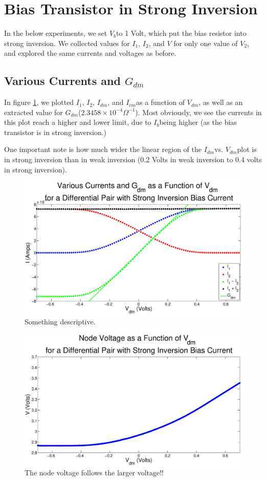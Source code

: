\documentclass{article}
\newcommand{\Vb}{{$V_{b}$}}
\newcommand{\Vtwo}{{$V_{2}$}}
\newcommand{\Itwo}{{$I_{2}$}}
\newcommand{\Ione}{{$I_{1}$}}
\newcommand{\gdm}{{$G_{dm}$}}
\newcommand{\Vdm}{{$V_{dm}$}}
\newcommand{\Idm}{{$I_{dm}$}}
\newcommand{\Icm}{{$I_{cm}$}}
\newcommand{\Ib}{{$I_{b}$}}
\begin{document}
\section*{Bias Transistor in Strong Inversion}

In the below experiments, we set \Vb to 1 Volt, which put the bias resistor into strong inversion. We collected values for \Ione, \Itwo, and $V$ for only one value of \Vtwo, and explored the same currents and voltages as before.

\subsection*{Various Currents and \gdm}

In figure \ref{fig:AllCurrentsStrongInversion}, we plotted \Ione, \Itwo, \Idm, and \Icm as a function of \Vdm, as well as an extracted value for \gdm ($2.3458 \times 10^{-4} \Omega^{-1}$). Most obviously, we see the currents in this plot reach a higher and lower limit, due to \Ib being higher (as the bias transistor is in strong inversion.)

One important note is how much wider the linear region of the \Idm vs. \Vdm plot is in strong inversion than in weak inversion (0.2 Volts in weak inversion to 0.4 volts in strong inversion). 

\begin{figure}[H]
\centering
\includegraphics[width=\linewidth]{./Figures/AllCurrentsStrongInversion.eps}
\caption{Something descriptive. }
\label{fig:AllCurrentsStrongInversion}
\end{figure}


\begin{figure}[H]
\centering
\includegraphics[width=\linewidth]{./Figures/NodeVoltageStrongInversion.eps}
\caption{The node voltage follows the larger voltage!!}
\label{fig:nodevoltageSI}
\end{figure}
\end{document}
